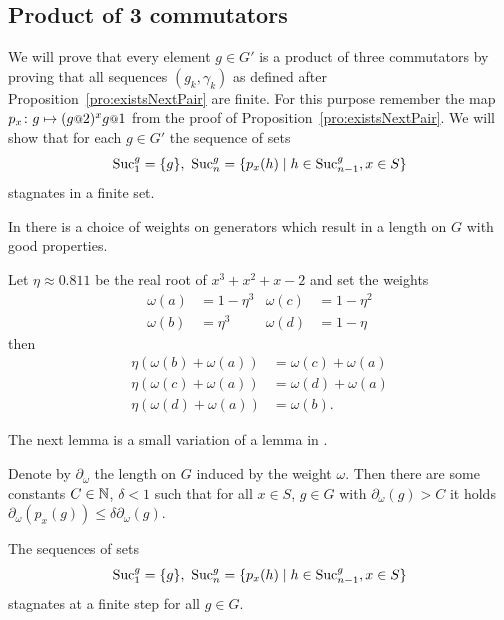 \documentclass[a4paper,11pt]{amsart}
\begin{document}
\subsection{Product of 3 commutators}
We will prove that every element $g\in G'$ is a product of three commutators by proving that all
sequences $(g_k,\gamma_k)$ as defined after Proposition~\ref{pro:existsNextPair} are finite.
For this purpose remember the map $p_x\colon g \mapsto (g\at{2})^x g\at{1}$ from the proof of Proposition~\ref{pro:existsNextPair}.
We will show that for each $g\in G'$ the sequence of sets 
\[\textup{Suc}_1^g=\{g\},\ \textup{Suc}_n^g = \{p_x(h) \mid h\in \textup{Suc}_{n-1}^g, x\in S\} \]
stagnates in a finite set. 

In \cite{Bartholdi:Growth} there is a choice of weights on generators which result in a length on $G$ with good properties.
\begin{lem} \label{lem:laurentsweights}
 Let $\eta\approx 0.811$ be the real root of $x^3+x^2+x-2$ and set the weights 
 \begin{align*}
  \omega(a) &= 1-\eta^3 & \omega(c)&=1-\eta^2 \\ \omega(b)&= \eta^3 & \omega(d)&=1-\eta
 \end{align*}
 then 
 \begin{align*}
  \eta(\omega(b)+\omega(a)) &= \omega(c)+\omega(a) \\
  \eta(\omega(c)+\omega(a)) &= \omega(d)+\omega(a) \\
  \eta(\omega(d)+\omega(a)) &= \omega(b).
 \end{align*}
\end{lem}
The next lemma is a small variation of a lemma in \cite{Bartholdi:Growth}.
\begin{lem}
 Denote by $\partial_\omega$ the length on $G$ induced by the weight $\omega$. Then
 there are some constants $C\in\mathbb{N}$, $\delta<1$ such that for all $x\in S$, $g\in G$ 
 with $\partial_\omega(g)>C$ it holds 
 $\partial_\omega(p_x(g)) \leq \delta \partial_\omega(g)$.
\end{lem}
\begin{cor}
The sequences of sets
 \[\textup{Suc}_1^g=\{g\},\ \textup{Suc}_n^g = \{p_x(h) \mid h\in \textup{Suc}_{n-1}^g, x\in S\} \]
 stagnates at a finite step for all $g\in G$.
\end{cor}
\end{document}
